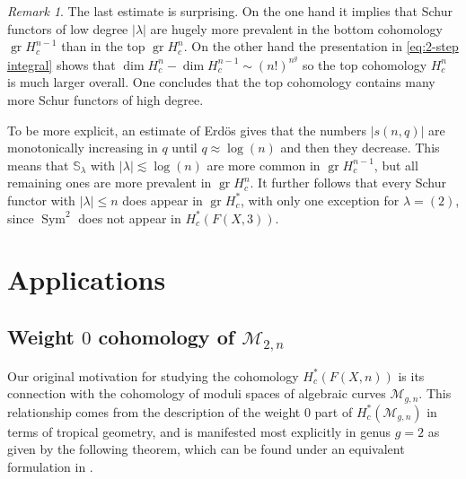 \documentclass[12pt]{article}
\newcommand{\Schur}[1]{\mathbb{S}_{#1}}
\newcommand{\ModuliCurve}[1]{\mathcal{M}_{#1}}
\DeclareMathOperator{\gr}{gr}
\DeclareMathOperator{\Sym}{Sym}
\theoremstyle{plain}
\theoremstyle{definition}
\theoremstyle{remark}
\newtheorem{rmk}[thm]{Remark}
\begin{document}
\begin{rmk}
    The last estimate is surprising. On the one hand it implies that Schur functors of low degree $|\lambda|$ are hugely more prevalent in the bottom cohomology $\gr H^{n-1}_c$ than in the top $\gr H^{n}_c$. On the other hand the presentation in \eqref{eq:2-step integral} shows that $\dim H^{n}_c - \dim H^{n-1}_c \sim (n!)^{n^g}$ so the top cohomology $H^{n}_c$ is much larger overall. One concludes that the top cohomology contains many more Schur functors of high degree.
    
    To be more explicit, an estimate of Erd\"{o}s \cite{Erdos53} gives that the numbers $|s(n,q)|$ are monotonically increasing in $q$ until $q \approx \log(n)$ and then they decrease. This means that $\Schur{\lambda}$ with $|\lambda|\lesssim\log(n)$ are more common in $\gr H^{n-1}_c$, but all remaining ones are more prevalent in $\gr H^n_c$. It further follows that every Schur functor with $|\lambda|\leq n$ does appear in $\gr H^*_c$, with only one exception for $\lambda=(2)$, since $\Sym^2$ does not appear in $H^*_c(F(X,3))$. %
    
\end{rmk}

\section{Applications}

\subsection{Weight \texorpdfstring{$0$}{0} cohomology of \texorpdfstring{$\ModuliCurve{2, n}$}{M2,n}}\label{sec:cohomology-M2n}
Our original motivation for studying the cohomology $H^*_c(F(X,n))$ is its connection with the cohomology of moduli spaces of algebraic curves $\ModuliCurve{g,n}$. This relationship comes from the description of the weight $0$ part of $H^*_c(\ModuliCurve{g,n})$ in terms of tropical geometry, and is manifested most explicitly in genus $g=2$ as given by the following theorem, which can be found under an equivalent formulation in \cite{BCGY21}.
\end{document}
